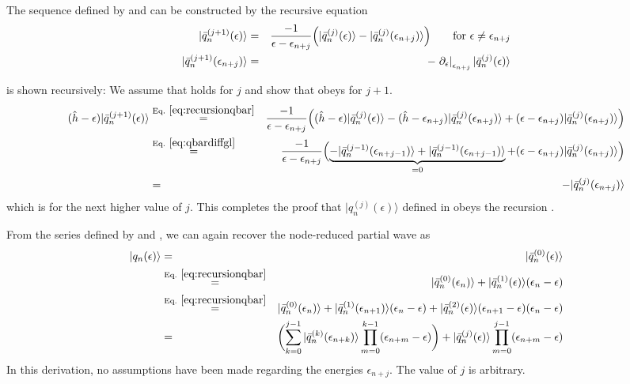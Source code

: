 \documentclass[11pt,a4paper]{report}
\begin{document}
The sequence defined by  and  can
be constructed by the recursive equation
\begin{eqnarray}
|\bar{q}_{n}^{(j+1)}(\epsilon)\rangle&=&
\frac{-1}{\epsilon-\epsilon_{n+j}}
\Bigl(|\bar{q}_n^{(j)}(\epsilon)\rangle
-|\bar{q}_n^{(j)}(\epsilon_{n+j})\rangle\Bigr)
\qquad\text{for $\epsilon\ne\epsilon_{n+j}$}
\nonumber\\
|\bar{q}_{n}^{(j+1)}(\epsilon_{n+j})\rangle&=&
-\left.\partial_\epsilon\right|_{\epsilon_{n+j}}|\bar{q}_n^{(j)}(\epsilon)\rangle
\label{eq:recursionqbar}
\end{eqnarray}

 is shown recursively: We assume that
 holds for $j$ and show that  
obeys  for $j+1$.
\begin{eqnarray}
(\hat{h}-\epsilon)|\bar{q}^{(j+1)}_{n}(\epsilon)\rangle
&\eqrel{eq:recursionqbar}{=}&
\frac{-1}{\epsilon-\epsilon_{n+j}}
\Bigl((\hat{h}-\epsilon)|\bar{q}_n^{(j)}(\epsilon)\rangle
-(\hat{h}-\epsilon_{n+j})|\bar{q}_n^{(j)}(\epsilon_{n+j})\rangle
+(\epsilon-\epsilon_{n+j})|\bar{q}_n^{(j)}(\epsilon_{n+j})\rangle
\Bigr)
\nonumber\\
&\eqrel{eq:qbardiffgl}{=}&
\frac{-1}{\epsilon-\epsilon_{n+j}}
\Bigl(
\underbrace{-|\bar{q}_n^{(j-1)}(\epsilon_{n+j-1})\rangle
+|\bar{q}_n^{(j-1)}(\epsilon_{n+j-1})\rangle}_{=0}
+(\epsilon-\epsilon_{n+j})|\bar{q}_n^{(j)}(\epsilon_{n+j})\rangle
\Bigr)
\nonumber\\
&=&
-|\bar{q}_n^{(j)}(\epsilon_{n+j})\rangle
\end{eqnarray}
which is  for the next higher value of $j$. This
completes the proof that $|q_{n}^{(j)}(\epsilon)\rangle$ defined in
 obeys the recursion .


From the series defined by  and
, we can again recover the node-reduced partial
wave as
\begin{eqnarray}
|q_n(\epsilon)\rangle&=&|\bar{q}_n^{(0)}(\epsilon)\rangle
\nonumber\\
&\eqrel{eq:recursionqbar}{=}&|\bar{q}_n^{(0)}(\epsilon_n)\rangle
+|\bar{q}_{n}^{(1)}(\epsilon)\rangle(\epsilon_n-\epsilon)
\nonumber\\
&\eqrel{eq:recursionqbar}{=}&|\bar{q}_n^{(0)}(\epsilon_n)\rangle
+|\bar{q}_{n}^{(1)}(\epsilon_{n+1})\rangle(\epsilon_n-\epsilon)
+|\bar{q}_{n}^{(2)}(\epsilon)\rangle
(\epsilon_{n+1}-\epsilon)(\epsilon_{n}-\epsilon)
\nonumber\\
&=&\biggl(\sum_{k=0}^{j-1}
|\bar{q}_{n}^{(k)}(\epsilon_{n+k})\rangle
\prod_{m=0}^{k-1}(\epsilon_{n+m}-\epsilon)\biggr)
+|\bar{q}_n^{(j)}(\epsilon)\rangle
\prod_{m=0}^{j-1}(\epsilon_{n+m}-\epsilon)
\label{eq:qnfromqj}
\end{eqnarray}
In this derivation, no assumptions have been made regarding the
energies $\epsilon_{n+j}$. The value of $j$ is arbitrary.
\end{document}

